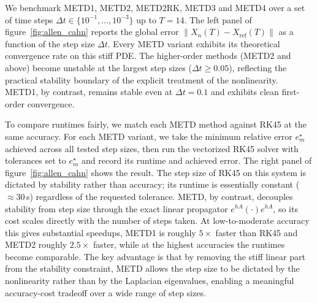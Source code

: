 \documentclass[12pt]{article}
\begin{document}
We benchmark METD1, METD2, METD2RK, METD3 and METD4 over a set of time steps $\Delta t\in\{10^{-1},\dots,10^{-3}\}$ up to $T=14$.
The left panel of figure~\ref{fig:allen_cahn} reports the global error
$\|X_n(T)-X_{\mathrm{ref}}(T)\|$ as a function of the step size $\Delta t$.
Every METD variant exhibits its theoretical convergence rate on this stiff
PDE. The higher-order methods (METD2 and above) become unstable at the largest step
sizes ($\Delta t \geq 0.05$), reflecting the practical stability boundary of
the explicit treatment of the nonlinearity. METD1, by contrast, remains stable
even at $\Delta t = 0.1$ and exhibits clean first-order convergence. 

To compare runtimes fairly, we match each METD method against RK45 at the
same accuracy. For each METD variant, we take the minimum relative
error $e_m^\star$ achieved across all tested step sizes, then run the
vectorized RK45 solver with tolerances set to $e_m^\star$ and record its runtime and achieved error. The right panel of figure~\ref{fig:allen_cahn} shows the result. The step size of RK45 on this system is dictated by stability rather than accuracy; its runtime is essentially constant ($\approx 30$\,s) regardless of the requested tolerance. METD, by contrast,
decouples stability from step size through the exact linear propagator
$e^{hA}(\cdot)e^{hA}$, so its cost scales directly with the number of steps
taken. At low-to-moderate accuracy this gives substantial speedups, METD1
is roughly $5\times$ faster than RK45 and METD2 roughly $2.5\times$
faster, while at the highest accuracies the runtimes become comparable. The key advantage is that by removing the stiff linear part from the
stability constraint, METD allows the step size to be dictated by the
nonlinearity rather than by the Laplacian eigenvalues, enabling a
meaningful accuracy-cost tradeoff over a wide range of step sizes.
\end{document}
